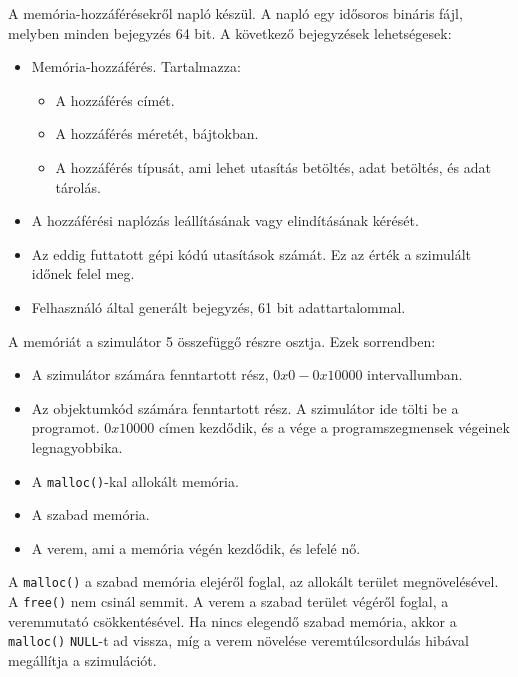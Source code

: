 \documentclass[12pt]{report}
\begin{document}
\bigskip

A memória-hozzáférésekről napló készül.
A napló egy idősoros bináris fájl,
melyben minden bejegyzés 64 bit.
A következő bejegyzések lehetségesek:
\begin{itemize}
\item Memória-hozzáférés. Tartalmazza:
\begin{itemize}
\item A hozzáférés címét.
\item A hozzáférés méretét, bájtokban.
\item A hozzáférés típusát, ami lehet utasítás betöltés, adat betöltés, és adat tárolás.
\end{itemize}

\item A hozzáférési naplózás leállításának vagy elindításának kérését.
\item Az eddig futtatott gépi kódú utasítások számát.
Ez az érték a szimulált időnek felel meg.
\item Felhasználó által generált bejegyzés, 61 bit adattartalommal.
\end{itemize}

\bigskip

A memóriát a szimulátor 5 összefüggő részre osztja. Ezek sorrendben:
\begin{itemize}
\item A szimulátor számára fenntartott rész, $0x0-0x10000$ intervallumban.
\item Az objektumkód számára fenntartott rész.
A szimulátor ide tölti be a programot. $0x10000$ címen kezdődik,
és a vége a programszegmensek végeinek legnagyobbika.
\item A \texttt{malloc()}-kal allokált memória.
\item A szabad memória.
\item A verem, ami a memória végén kezdődik,
és lefelé nő.
\end{itemize}

A \texttt{malloc()} a szabad memória elejéről foglal,
az allokált terület megnövelésével.
A \texttt{free()} nem csinál semmit.
A verem a szabad terület végéről foglal,
a veremmutató csökkentésével.
Ha nincs elegendő szabad memória,
akkor a \texttt{malloc()} \texttt{NULL}-t ad vissza,
míg a verem növelése veremtúlcsordulás hibával megállítja a szimulációt.

\bigskip
\end{document}
